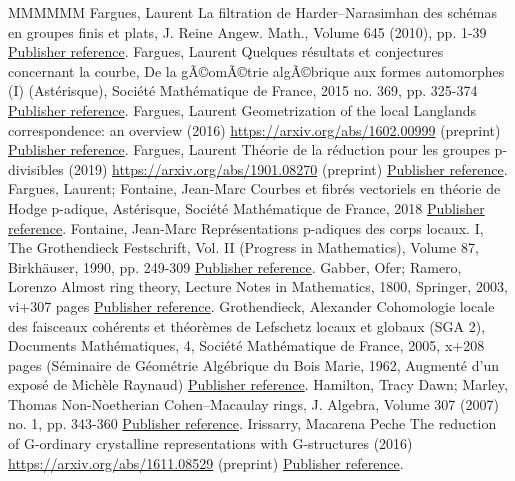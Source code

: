 \documentclass[11pt]{article}
\theoremstyle{definition}
\numberwithin{equation}{section}
\numberwithin{figure}{section}
\numberwithin{table}{section}
\begin{document}
\begin{thebibliography}{MMMMMM}
 Fargues, Laurent La filtration de Harder–Narasimhan des schémas en groupes finis et plats, J. Reine Angew. Math., Volume 645 (2010), pp. 1-39 \href{https://ahl.centre-mersenne.org/item/AHL_2019__2__415_0/#Fa10}{Publisher reference}.
 Fargues, Laurent Quelques résultats et conjectures concernant la courbe, De la gÃ©omÃ©trie algÃ©brique aux formes automorphes (I) (Astérisque), Société Mathématique de France, 2015 no. 369, pp. 325-374 \href{https://ahl.centre-mersenne.org/item/AHL_2019__2__415_0/#Fa15}{Publisher reference}.
 Fargues, Laurent Geometrization of the local Langlands correspondence: an overview (2016) \url{https://arxiv.org/abs/1602.00999} (preprint) \href{https://ahl.centre-mersenne.org/item/AHL_2019__2__415_0/#Fa16}{Publisher reference}.
 Fargues, Laurent Théorie de la réduction pour les groupes p-divisibles (2019) \url{https://arxiv.org/abs/1901.08270} (preprint) \href{https://ahl.centre-mersenne.org/item/AHL_2019__2__415_0/#Fa12}{Publisher reference}.
 Fargues, Laurent; Fontaine, Jean-Marc Courbes et fibrés vectoriels en théorie de Hodge p-adique, Astérisque, Société Mathématique de France, 2018 \href{https://ahl.centre-mersenne.org/item/AHL_2019__2__415_0/#FaFo15}{Publisher reference}.
 Fontaine, Jean-Marc Représentations p-adiques des corps locaux. I, The Grothendieck Festschrift, Vol. II (Progress in Mathematics), Volume 87, Birkhäuser, 1990, pp. 249-309 \href{https://ahl.centre-mersenne.org/item/AHL_2019__2__415_0/#Fo90}{Publisher reference}.
 Gabber, Ofer; Ramero, Lorenzo Almost ring theory, Lecture Notes in Mathematics, 1800, Springer, 2003, vi+307 pages \href{https://ahl.centre-mersenne.org/item/AHL_2019__2__415_0/#GaRa03}{Publisher reference}.
 Grothendieck, Alexander Cohomologie locale des faisceaux cohérents et théorèmes de Lefschetz locaux et globaux (SGA 2), Documents Mathématiques, 4, Société Mathématique de France, 2005, x+208 pages (Séminaire de Géométrie Algébrique du Bois Marie, 1962, Augmenté d’un exposé de Michèle Raynaud) \href{https://ahl.centre-mersenne.org/item/AHL_2019__2__415_0/#SGA2r}{Publisher reference}.
 Hamilton, Tracy Dawn; Marley, Thomas Non-Noetherian Cohen–Macaulay rings, J. Algebra, Volume 307 (2007) no. 1, pp. 343-360 \href{https://ahl.centre-mersenne.org/item/AHL_2019__2__415_0/#HaMa07}{Publisher reference}.
 Irissarry, Macarena Peche The reduction of G-ordinary crystalline representations with G-structures (2016) \url{https://arxiv.org/abs/1611.08529} (preprint) \href{https://ahl.centre-mersenne.org/item/AHL_2019__2__415_0/#Imp16}{Publisher reference}.

\end{thebibliography}
\end{document}
